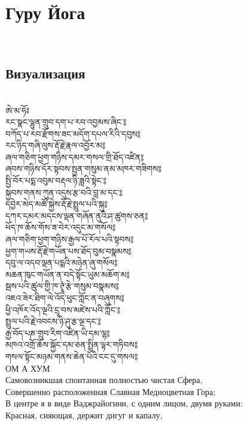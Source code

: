 \section{Гуру Йога}
\\
\subsection{Визуализация}
\\
\ti
ཨེ་མ་ཧོཿ \\
རང་སྣང་ལྷུན་གྲུབ་དག་པ་རབ་འབྱམས་ཞིང་༔ \\
བཀོད་པ་རབ་རྫོགས་ཟང་མདོག་དཔལ་རིའི་དབུས༔\\
རང་ཉིད་གཞི་ལུས་རྡོ་རྗེ་རྣལ་འབྱོར་མ༔\\
ཞལ་གཅིག་ཕྱག་གཉིས་དམར་གསལ་གྲི་ཐོད་འཛིན༔\\
ཞབས་གཉིས་དོར་སྟབས་སྤྱན་གསུམ་ནམ་མཁར་གཟིགས༔\\
སྤྱི་བོར་པདྨ་འབུམ་བརྡལ་ཉི་ཟླའི་སྟེང་༔\\
སྐྱབས་གནས་ཀུན་འདུས་རྩ་བའི་བླ་མ་དང་༔\\
དབྱེར་མེད་མཚོ་སྐྱེས་རྡོ་རྗེ་སྤྲུལ་པའི་སྐུ༔\\
དཀར་དམར་མདངས་ལྡན་གཞོན་ནུའི་ཤ་ཚུགས་ཅན༔\\
ཕོད་ཁ་ཆོས་གོས་ཟ་བེར་འདུང་མ་གསོལ༔\\
ཞལ་གཅིག་ཕྱག་གཉིས་རྒྱལ་པོ་རོལ་པའི་སྟབས༔\\
ཕྱག་གཡས་རྡོ་རྗེ་གཡོན་པས་ཐོད་བུམ་བསྣམས༔\\
དབུ་ལ་འདབ་ལྡན་པདྨའི་མཉེན་ཞུ་གསོལ༔\\
མཆན་ཁུང་གཡོན་ན་བདེ་སྟོང་ཡུམ་མཆོག་མ༔\\
སྦས་པའི་ཚུལ་གྱི་ཁ་ཊྭཱཾ་རྩེ་གསུམ་བསྣམས༔\\
འཇའ་ཟེར་ཐིག་ལེ་འོད་ཕུང་ཀློང་ན་བཞུགས༔\\
ཕྱི་འཁོར་འོད་ལྔའི་དྲྭ་བས་མཛེས་པའི་ཀློང་༔\\
སྤྲུལ་པའི་རྗེ་འབངས་ཉི་ཤུ་རྩ་ལྔ་དང་༔\\
རྒྱ་བོད་པཎ་གྲུབ་རིག་འཛིན་ཡི་དམ་ལྷ༔\\
མཁའ་འགྲོ་ཆོས་སྐྱོང་དམ་ཅན་སྤྲིན་ལྟར་གཏིབས༔\\
གསལ་སྟོང་མཉམ་གནས་ཆེན་པོའི་ངང་དུ་གསལ༔\\
\ru
\newpage
ОМ А ХУМ\\
Самовозникшая спонтанная полностью чистая Сфера,\\
Совершенно расположенная Славная Медноцветная Гора; \\
В центре я в виде Ваджрайогини, с одним лицом, двумя руками:\\
Красная, сияющая, держит дигуг и капалу,\\
